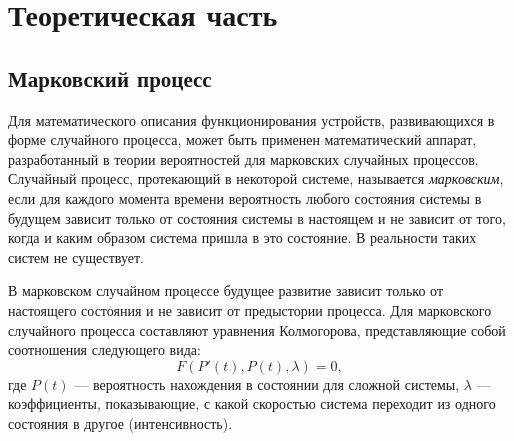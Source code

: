 \section{Теоретическая часть}

\subsection{Марковский процесс}

Для математического описания функционирования устройств, развивающихся в форме случайного процесса, может быть применен математический аппарат, разработанный в теории вероятностей для марковских случайных процессов.
Случайный процесс, протекающий в некоторой системе, называется \textit{марковским}, если для каждого момента времени вероятность любого состояния системы в будущем зависит только от состояния системы в настоящем и не зависит от того, когда и каким образом система пришла в это состояние.
В реальности таких систем не существует.

В марковском случайном процессе будущее развитие зависит только от настоящего состояния и не зависит от предыстории процесса.
Для марковского случайного процесса составляют уравнения Колмогорова, представляющие собой соотношения следующего вида:
\begin{equation}
	F(P'(t), P(t), \lambda) = 0,
\end{equation}
где $P(t)$ --- вероятность нахождения в состоянии для сложной системы,
$\lambda$ --- коэффициенты, показывающие, с какой скоростью система переходит из одного состояния в другое (интенсивность).
